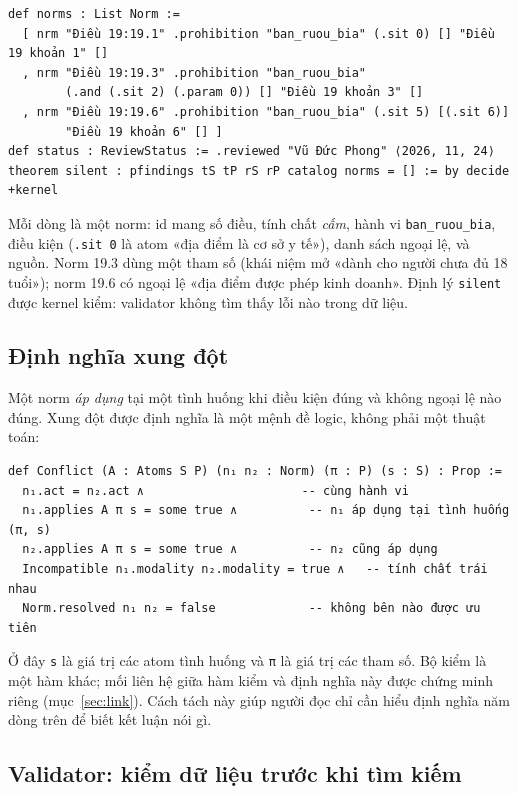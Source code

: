 \documentclass[12pt,a4paper]{article}
\newcommand{\code}[1]{\texttt{#1}}
\begin{document}
\begin{Verbatim}
def norms : List Norm :=
  [ nrm "Điều 19:19.1" .prohibition "ban_ruou_bia" (.sit 0) [] "Điều 19 khoản 1" []
  , nrm "Điều 19:19.3" .prohibition "ban_ruou_bia"
        (.and (.sit 2) (.param 0)) [] "Điều 19 khoản 3" []
  , nrm "Điều 19:19.6" .prohibition "ban_ruou_bia" (.sit 5) [(.sit 6)]
        "Điều 19 khoản 6" [] ]
def status : ReviewStatus := .reviewed "Vũ Đức Phong" ⟨2026, 11, 24⟩
theorem silent : pfindings tS tP rS rP catalog norms = [] := by decide +kernel
\end{Verbatim}

Mỗi dòng là một norm: id mang số điều, tính chất \emph{cấm}, hành vi \code{ban\_ruou\_bia}, điều kiện (\code{.sit 0} là atom
«địa điểm là cơ sở y tế»), danh sách ngoại lệ, và nguồn. Norm 19.3 dùng một tham số (khái niệm mở «dành cho người chưa đủ 18
tuổi»); norm 19.6 có ngoại lệ «địa điểm được phép kinh doanh». Định lý \code{silent} được kernel kiểm: validator không tìm thấy
lỗi nào trong dữ liệu.

\subsection{Định nghĩa xung đột}

Một norm \emph{áp dụng} tại một tình huống khi điều kiện đúng và không ngoại lệ nào đúng. Xung đột được định nghĩa là một mệnh
đề logic, không phải một thuật toán:

\begin{Verbatim}
def Conflict (A : Atoms S P) (n₁ n₂ : Norm) (π : P) (s : S) : Prop :=
  n₁.act = n₂.act ∧                      -- cùng hành vi
  n₁.applies A π s = some true ∧          -- n₁ áp dụng tại tình huống (π, s)
  n₂.applies A π s = some true ∧          -- n₂ cũng áp dụng
  Incompatible n₁.modality n₂.modality = true ∧   -- tính chất trái nhau
  Norm.resolved n₁ n₂ = false             -- không bên nào được ưu tiên
\end{Verbatim}

Ở đây \code{s} là giá trị các atom tình huống và \code{π} là giá trị các tham số. Bộ kiểm là một hàm khác; mối liên hệ giữa
hàm kiểm và định nghĩa này được chứng minh riêng (mục~\ref{sec:link}). Cách tách này giúp người đọc chỉ cần hiểu định nghĩa
năm dòng trên để biết kết luận nói gì.

\subsection{Validator: kiểm dữ liệu trước khi tìm kiếm}
\end{document}
